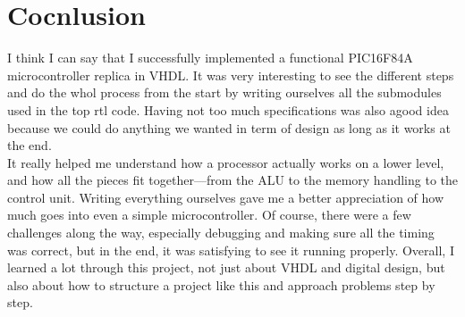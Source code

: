 \section*{Cocnlusion}

I think I can say that I successfully implemented a functional PIC16F84A microcontroller replica in VHDL. It was very interesting to see the different steps and do the whol process from the start by writing ourselves all the submodules used in the top rtl code. Having not too much specifications was also agood idea because we could do anything we wanted in term of design as long as it works at the end. \\
It really helped me understand how a processor actually works on a lower level, and how all the pieces fit together—from the ALU to the memory handling to the control unit. Writing everything ourselves gave me a better appreciation of how much goes into even a simple microcontroller. Of course, there were a few challenges along the way, especially debugging and making sure all the timing was correct, but in the end, it was satisfying to see it running properly. Overall, I learned a lot through this project, not just about VHDL and digital design, but also about how to structure a project like this and approach problems step by step.
